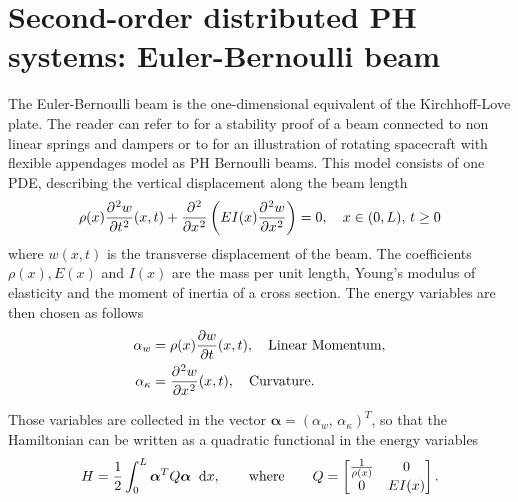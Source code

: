 \documentclass[preprint,12pt]{elsarticle}
\begin{document}
\section{Second-order distributed PH systems: Euler-Bernoulli beam}	
The Euler-Bernoulli beam is the one-dimensional equivalent of the Kirchhoff-Love plate. The reader can refer to \cite{Gorrec2017} for a stability proof of a beam connected to non linear springs and dampers or to \cite{aoues:hal-01738092} for an illustration of rotating spacecraft with flexible appendages model as PH Bernoulli beams. This model consists of one PDE, describing the vertical displacement along the beam length
\begin{equation}
\rho(x) \diffp[2]{w}{t}(x,t) + \displaystyle \diffp[2]{}{x} \left( EI(x) \diffp[2]{w}{x} \right) = 0, \quad x \in (0,L),\, t \ge 0 
\end{equation}
where ${w}(x,t)$ is the transverse displacement of the beam. The coefficients $\rho(x), E(x)$ and $I(x)$  are the mass per unit length, Young's modulus of elasticity and the moment of inertia of a cross section. The energy variables are then chosen as follows
\begin{equation}
\begin{aligned}
\alpha_{w} &= \rho(x) \diffp{w}{t}(x,t),  \quad \text{Linear Momentum},\\
\alpha_{\kappa} &= \diffp[2]{w}{x}(x,t), \quad \text{Curvature}. \\
\end{aligned}
\end{equation}

Those variables are collected in the vector $\bm{\alpha} = (\alpha_{w}, \, \alpha_{\kappa})^T $, so that the Hamiltonian can be written as a quadratic functional in the energy variables 
\begin{equation}
H = \frac{1}{2} \int_{0}^{L} \bm{\alpha}^T Q \bm{\alpha} \; \d{x},
\qquad \text{where} \qquad
Q = 
\begin{bmatrix}
\frac{1}{\rho(x)} & 0 \\
0 & EI(x) \\
\end{bmatrix}.
\end{equation}
\end{document}

